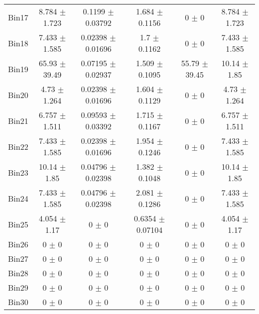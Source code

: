 \begin{tabular}{@{\extracolsep{4pt}}lccccc@{}}
     Bin17 & 8.784 $\pm$ 1.723 & 0.1199 $\pm$ 0.03792 & 1.684 $\pm$ 0.1156 & 0 $\pm$ 0 & 8.784 $\pm$ 1.723 \\ 
     Bin18 & 7.433 $\pm$ 1.585 & 0.02398 $\pm$ 0.01696 & 1.7 $\pm$ 0.1162 & 0 $\pm$ 0 & 7.433 $\pm$ 1.585 \\ 
     Bin19 & 65.93 $\pm$ 39.49 & 0.07195 $\pm$ 0.02937 & 1.509 $\pm$ 0.1095 & 55.79 $\pm$ 39.45 & 10.14 $\pm$ 1.85 \\ 
     Bin20 & 4.73 $\pm$ 1.264 & 0.02398 $\pm$ 0.01696 & 1.604 $\pm$ 0.1129 & 0 $\pm$ 0 & 4.73 $\pm$ 1.264 \\ 
     Bin21 & 6.757 $\pm$ 1.511 & 0.09593 $\pm$ 0.03392 & 1.715 $\pm$ 0.1167 & 0 $\pm$ 0 & 6.757 $\pm$ 1.511 \\ 
     Bin22 & 7.433 $\pm$ 1.585 & 0.02398 $\pm$ 0.01696 & 1.954 $\pm$ 0.1246 & 0 $\pm$ 0 & 7.433 $\pm$ 1.585 \\ 
     Bin23 & 10.14 $\pm$ 1.85 & 0.04796 $\pm$ 0.02398 & 1.382 $\pm$ 0.1048 & 0 $\pm$ 0 & 10.14 $\pm$ 1.85 \\ 
     Bin24 & 7.433 $\pm$ 1.585 & 0.04796 $\pm$ 0.02398 & 2.081 $\pm$ 0.1286 & 0 $\pm$ 0 & 7.433 $\pm$ 1.585 \\ 
     Bin25 & 4.054 $\pm$ 1.17 & 0 $\pm$ 0 & 0.6354 $\pm$ 0.07104 & 0 $\pm$ 0 & 4.054 $\pm$ 1.17 \\ 
     Bin26 & 0 $\pm$ 0 & 0 $\pm$ 0 & 0 $\pm$ 0 & 0 $\pm$ 0 & 0 $\pm$ 0 \\ 
     Bin27 & 0 $\pm$ 0 & 0 $\pm$ 0 & 0 $\pm$ 0 & 0 $\pm$ 0 & 0 $\pm$ 0 \\ 
     Bin28 & 0 $\pm$ 0 & 0 $\pm$ 0 & 0 $\pm$ 0 & 0 $\pm$ 0 & 0 $\pm$ 0 \\ 
     Bin29 & 0 $\pm$ 0 & 0 $\pm$ 0 & 0 $\pm$ 0 & 0 $\pm$ 0 & 0 $\pm$ 0 \\ 
     Bin30 & 0 $\pm$ 0 & 0 $\pm$ 0 & 0 $\pm$ 0 & 0 $\pm$ 0 & 0 $\pm$ 0 \\ 
\hline\hline
  \end{tabular}
